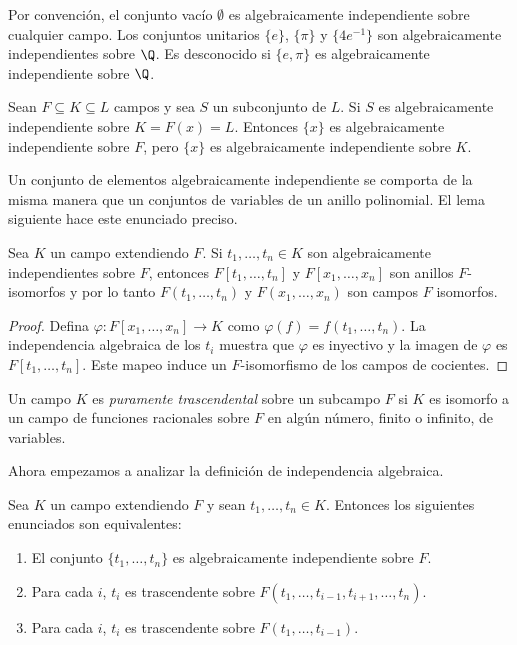 \begin{example}
  Por convención, el conjunto vacío $\emptyset$ es algebraicamente independiente sobre cualquier campo. Los conjuntos unitarios $\{e\}$, $\{\pi\}$ y $\{4e^{-1}\}$ son algebraicamente independientes sobre $\Q$. Es desconocido si $\{e, \pi\}$ es algebraicamente independiente sobre $\Q$.
\end{example}

\begin{example}
  Sean $F \subseteq K \subseteq L$ campos y sea $S$ un subconjunto de $L$. Si $S$ es algebraicamente independiente sobre $K = F(x) = L$. Entonces $\{x\}$ es algebraicamente independiente sobre $F$, pero $\{x\}$ es algebraicamente independiente sobre $K$.
\end{example}

Un conjunto de elementos algebraicamente independiente se comporta de la misma manera que un conjuntos de variables de un anillo polinomial. El lema siguiente hace este enunciado preciso.

\begin{lemma}
  Sea $K$ un campo extendiendo $F$. Si $t_1, \ldots, t_n \in K$ son algebraicamente independientes sobre $F$, entonces $F[t_1, \ldots, t_n]$ y $F[x_1, \ldots, x_n]$ son anillos $F$-isomorfos y por lo tanto $F(t_1,\ldots,t_n)$ y $F(x_1, \ldots, x_n)$ son campos $F$ isomorfos.
\end{lemma}

\begin{proof}
  Defina $\varphi\colon F[x_1, \ldots, x_n] \to K$ como $\varphi(f) = f(t_1, \ldots, t_n)$. La independencia algebraica de los $t_i$ muestra que $\varphi$ es inyectivo y la imagen de $\varphi$ es $F[t_1, \ldots, t_n]$. Este mapeo induce un $F$-isomorfismo de los campos de cocientes.
\end{proof}

\begin{definition}
  Un campo $K$ es \emph{puramente trascendental} sobre un subcampo $F$ si $K$ es isomorfo a un campo de funciones racionales sobre $F$ en algún número, finito o infinito, de variables.
\end{definition}

Ahora empezamos a analizar la definición de independencia algebraica.

\begin{lemma}
  Sea $K$ un campo extendiendo $F$ y sean $t_1, \ldots, t_n \in K$. Entonces los siguientes enunciados son equivalentes:
  \begin{enumerate}
    \item El conjunto $\{t_1, \ldots, t_n\}$ es algebraicamente independiente sobre $F$.
    \item Para cada $i$, $t_i$ es trascendente sobre $F(t_1,\ldots,t_{i-1}, t_{i+1}, \ldots, t_n)$.
    \item Para cada $i$, $t_i$ es trascendente sobre $F(t_1, \ldots, t_{i-1})$.
  \end{enumerate}
\end{lemma}

